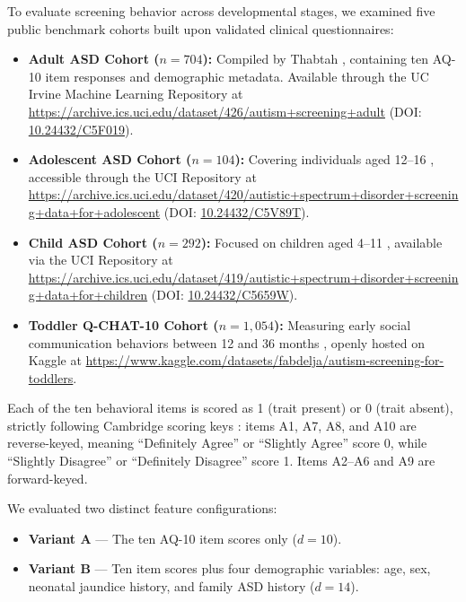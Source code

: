\documentclass[conference]{IEEEtran}
\begin{document}
To evaluate screening behavior across developmental stages, we examined five public benchmark cohorts built upon validated clinical questionnaires:
\begin{itemize}
\item \textbf{Adult ASD Cohort ($n = 704$):} Compiled by Thabtah \cite{thabtah2019, uci_adult}, containing ten AQ-10 item responses and demographic metadata. Available through the UC Irvine Machine Learning Repository at \url{https://archive.ics.uci.edu/dataset/426/autism+screening+adult} (DOI: \href{https://doi.org/10.24432/C5F019}{10.24432/C5F019}).
\item \textbf{Adolescent ASD Cohort ($n = 104$):} Covering individuals aged 12--16 \cite{thabtah2019, uci_adolescent}, accessible through the UCI Repository at \url{https://archive.ics.uci.edu/dataset/420/autistic+spectrum+disorder+screening+data+for+adolescent} (DOI: \href{https://doi.org/10.24432/C5V89T}{10.24432/C5V89T}).
\item \textbf{Child ASD Cohort ($n = 292$):} Focused on children aged 4--11 \cite{thabtah2019, uci_child}, available via the UCI Repository at \url{https://archive.ics.uci.edu/dataset/419/autistic+spectrum+disorder+screening+data+for+children} (DOI: \href{https://doi.org/10.24432/C5659W}{10.24432/C5659W}).
\item \textbf{Toddler Q-CHAT-10 Cohort ($n = 1,054$):} Measuring early social communication behaviors between 12 and 36 months \cite{thabtah2018toddler}, openly hosted on Kaggle at \url{https://www.kaggle.com/datasets/fabdelja/autism-screening-for-toddlers}.
\end{itemize}

Each of the ten behavioral items is scored as 1 (trait present) or 0 (trait absent), strictly following Cambridge scoring keys \cite{allison2012}: items A1, A7, A8, and A10 are reverse-keyed, meaning ``Definitely Agree'' or ``Slightly Agree'' score 0, while ``Slightly Disagree'' or ``Definitely Disagree'' score 1. Items A2--A6 and A9 are forward-keyed.

We evaluated two distinct feature configurations:
\begin{itemize}
\item \textbf{Variant A} --- The ten AQ-10 item scores only ($d = 10$).
\item \textbf{Variant B} --- Ten item scores plus four demographic variables: age, sex, neonatal jaundice history, and family ASD history ($d = 14$).
\end{itemize}
\end{document}
